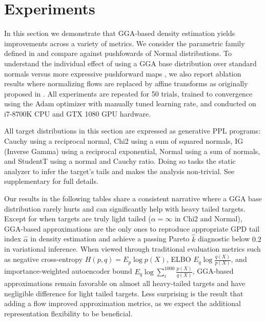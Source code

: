 \documentclass[../thesis.tex]{subfiles}
\begin{document}
\section{Experiments}\label{sec:hta:experiments}

In this section we demonstrate that GGA-based density estimation yields improvements across a variety of metrics.
We consider the parametric family defined in  and compare against pushfowards of Normal distributions. To understand the individual
effect of using a GGA base distribution over standard normals versus more expressive pushforward maps \citep{durkan2019neural}, we also report ablation results where
normalizing flows are replaced by affine transforms as originally
proposed in \citep{kucukelbir2017automatic}. All experiments are repeated for 50 trials, trained to convergence using the Adam optimizer with manually tuned learning rate,
and conducted on i7-8700K CPU and GTX 1080 GPU hardware.

All target distributions in this section are expressed as generative PPL programs:
Cauchy using a reciprocal normal, Chi2 using a sum of squared normals, IG (Inverse Gamma)
using a reciprocal exponential, Normal using a sum of normals, and StudentT using a
normal and Cauchy ratio. Doing so tasks the static analyzer to infer the target's tails and makes the analysis non-trivial.
See supplementary for full details.

Our results in the following tables share a consistent narrative where a GGA base
distribution rarely hurts and can significantly help with heavy tailed targets.
Except for when targets are truly light tailed ($\alpha=\infty$ in Chi2 and Normal),
GGA-based approximations are the only ones to reproduce appropriate GPD tail index $\hat\alpha$ in density estimation and achieve a passing Pareto $\hat{k}$ diagnostic
\citep{yao2018yes} below $0.2$ in variational inference. When viewed through traditional
evaluation metrics such as negative cross-entropy $H(p,q) = E_p \log p(X)$,
ELBO $E_q \log \frac{q(X)}{p(X)}$,
and importance-weighted autoencoder bound \citep{burda2015importance} $E_q \log \sum_i^{1000} \frac{p(X)}{q(X)}$, GGA-based approximations remain favorable on almost all heavy-tailed
targets and have negligible difference for light tailed targets. Less surprising is the result that adding a flow improved approximation metrics, as we expect the additional representation flexibility to be beneficial.

\end{document}
